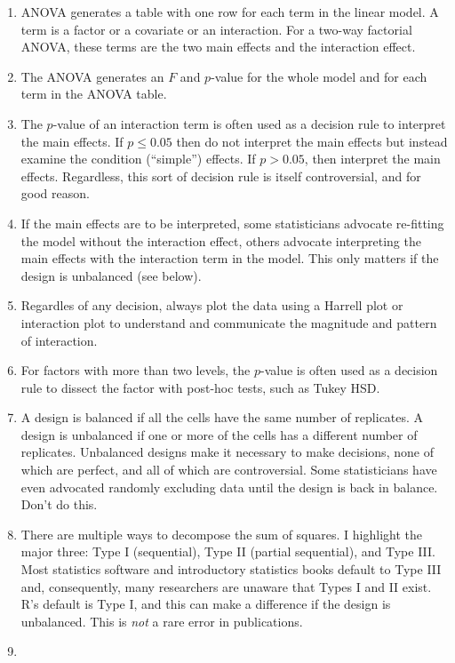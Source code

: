 \documentclass[]{book}
\providecommand{\tightlist}{%
  \setlength{\itemsep}{0pt}\setlength{\parskip}{0pt}}
\begin{document}
\begin{enumerate}
\def\labelenumi{\arabic{enumi}.}
\tightlist
\item
  ANOVA generates a table with one row for each term in the linear model. A term is a factor or a covariate or an interaction. For a two-way factorial ANOVA, these terms are the two main effects and the interaction effect.
\item
  The ANOVA generates an \(F\) and \(p\)-value for the whole model and for each term in the ANOVA table.
\item
  The \(p\)-value of an interaction term is often used as a decision rule to interpret the main effects. If \(p \le 0.05\) then do not interpret the main effects but instead examine the condition (``simple'') effects. If \(p > 0.05\), then interpret the main effects. Regardless, this sort of decision rule is itself controversial, and for good reason.
\item
  If the main effects are to be interpreted, some statisticians advocate re-fitting the model without the interaction effect, others advocate interpreting the main effects with the interaction term in the model. This only matters if the design is unbalanced (see below).
\item
  Regardles of any decision, always plot the data using a Harrell plot or interaction plot to understand and communicate the magnitude and pattern of interaction.
\item
  For factors with more than two levels, the \(p\)-value is often used as a decision rule to dissect the factor with post-hoc tests, such as Tukey HSD.
\item
  A design is balanced if all the cells have the same number of replicates. A design is unbalanced if one or more of the cells has a different number of replicates. Unbalanced designs make it necessary to make decisions, none of which are perfect, and all of which are controversial. Some statisticians have even advocated randomly excluding data until the design is back in balance. Don't do this.
\item
  There are multiple ways to decompose the sum of squares. I highlight the major three: Type I (sequential), Type II (partial sequential), and Type III. Most statistics software and introductory statistics books default to Type III and, consequently, many researchers are unaware that Types I and II exist. R's default is Type I, and this can make a difference if the design is unbalanced. This is \emph{not} a rare error in publications.
\item

\end{enumerate}
\end{document}
